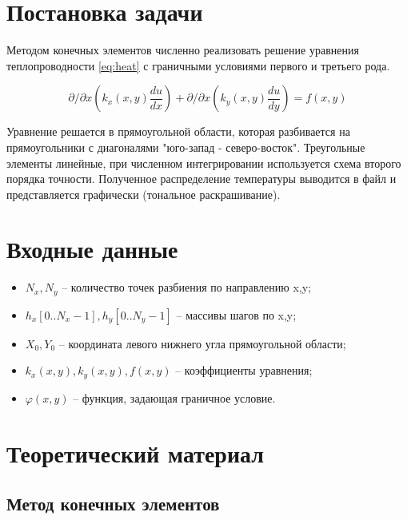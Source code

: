 \documentclass[a4paper, 14pt]{extarticle}
\begin{document}


\setcounter{page}{2} %

\tableofcontents

\clearpage

\section{Постановка задачи}

Методом конечных элементов численно реализовать решение уравнения
теплопроводности \ref{eq:heat} с граничными условиями первого и третьего рода.

\begin{equation}
\partial/\partial x \left(k_x(x,y) \frac{du}{dx} \right) +
\partial/\partial x \left(k_y(x,y) \frac{du}{dy}\right) = f(x,y)
\end{equation} \label{eq:heat}

Уравнение решается в прямоугольной области, которая разбивается на
прямоугольники с диагоналями "юго-запад - северо-восток". Треугольные элементы
линейные, при численном интегрировании используется схема второго порядка
точности. Полученное распределение температуры выводится в файл и представляется
графически (тональное раскрашивание).

\clearpage

\section{Входные данные}

\begin{itemize}
	\item $N_x, N_y$ --  количество точек разбиения по направлению x,y;
	\item $h_x[0 .. N_x-1], h_y[0 .. N_y-1]$ -- массивы шагов по x,y;
	\item $X_0, Y_0$ -- координата левого нижнего угла прямоугольной области;
	\item $k_x(x,y), k_y(x,y), f(x,y)$ -- коэффициенты уравнения;
	\item $\varphi(x,y)$ -- функция, задающая граничное условие.
\end{itemize}

\clearpage
\section{Теоретический материал}

\subsection{Метод конечных элементов}
\end{document}
